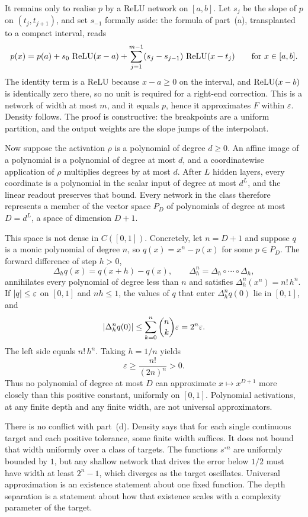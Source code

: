 It remains only to realise \(p\) by a ReLU network on \([a,b]\). Let \(s_j\) be the slope of \(p\) on \((t_j,t_{j+1})\), and set \(s_{-1}\) formally aside: the formula of part~(a), transplanted to a compact interval, reads
\[
  p(x)
  =
  p(a) + s_0\,\operatorname{ReLU}(x-a)
  + \sum_{j=1}^{m-1} (s_j-s_{j-1})\,\operatorname{ReLU}(x-t_j)
  \qquad\text{for } x\in[a,b].
\]
The identity term is a ReLU because \(x-a\ge 0\) on the interval, and \(\operatorname{ReLU}(x-b)\) is identically zero there, so no unit is required for a right-end correction. This is a network of width at most \(m\), and it equals \(p\), hence it approximates \(F\) within \(\varepsilon\). Density follows. The proof is constructive: the breakpoints are a uniform partition, and the output weights are the slope jumps of the interpolant.

Now suppose the activation \(\rho\) is a polynomial of degree \(d\ge 0\). An affine image of a polynomial is a polynomial of degree at most \(d\), and a coordinatewise application of \(\rho\) multiplies degrees by at most \(d\). After \(L\) hidden layers, every coordinate is a polynomial in the scalar input of degree at most \(d^L\), and the linear readout preserves that bound. Every network in the class therefore represents a member of the vector space \(P_D\) of polynomials of degree at most \(D=d^L\), a space of dimension \(D+1\).

This space is not dense in \(C([0,1])\). Concretely, let \(n=D+1\) and suppose \(q\) is a monic polynomial of degree \(n\), so \(q(x)=x^n-p(x)\) for some \(p\in P_D\). The forward difference of step \(h>0\),
\[
  \Delta_h q(x) = q(x+h)-q(x),
  \qquad
  \Delta_h^{n} = \Delta_h\circ\cdots\circ\Delta_h,
\]
annihilates every polynomial of degree less than \(n\) and satisfies \(\Delta_h^{n}(x^n) = n!\, h^n\). If \(\lvert q\rvert\le\varepsilon\) on \([0,1]\) and \(nh\le 1\), the values of \(q\) that enter \(\Delta_h^{n} q(0)\) lie in \([0,1]\), and
\[
  \lvert\Delta_h^{n} q(0)\rvert
  \le
  \sum_{k=0}^{n}\binom{n}{k}\varepsilon
  =
  2^n\varepsilon.
\]
The left side equals \(n!\, h^n\). Taking \(h=1/n\) yields
\[
  \varepsilon \ge \frac{n!}{(2n)^n} > 0.
\]
Thus no polynomial of degree at most \(D\) can approximate \(x\mapsto x^{D+1}\) more closely than this positive constant, uniformly on \([0,1]\). Polynomial activations, at any finite depth and any finite width, are not universal approximators.

There is no conflict with part~(d). Density says that for each single continuous target and each positive tolerance, some finite width suffices. It does not bound that width uniformly over a class of targets. The functions \(s^{\circ n}\) are uniformly bounded by \(1\), but any shallow network that drives the error below \(1/2\) must have width at least \(2^n-1\), which diverges as the target oscillates. Universal approximation is an existence statement about one fixed function. The depth separation is a statement about how that existence scales with a complexity parameter of the target.

